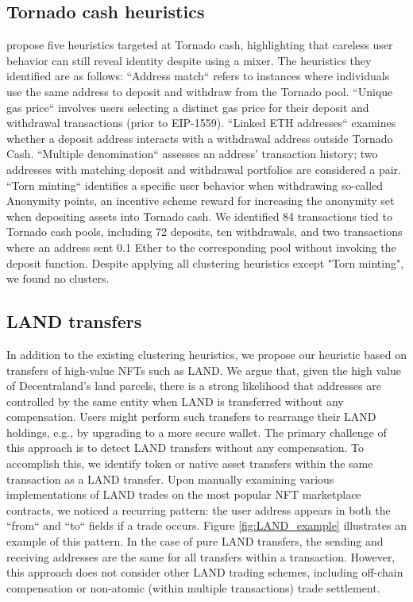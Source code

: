 \documentclass[12pt,a4paper,titlepage,oneside,english]{article}
\begin{document}
\subsection{Tornado cash heuristics}
\cite{wu2022tutela} propose five heuristics targeted at Tornado cash, highlighting that careless user behavior can still reveal identity despite using a mixer. The heuristics they identified are as follows: \newline
``Address match`` refers to instances where individuals use the same address to deposit and withdraw from the Tornado pool. ``Unique gas price`` involves users selecting a distinct gas price for their deposit and withdrawal transactions (prior to EIP-1559). ``Linked ETH addresses`` examines whether a deposit address interacts with a withdrawal address outside Tornado Cash. ``Multiple denomination`` assesses an address' transaction history; two addresses with matching deposit and withdrawal portfolios are considered a pair. ``Torn minting`` identifies a specific user behavior when withdrawing so-called Anonymity points, an incentive scheme reward for increasing the anonymity set when depositing assets into Tornado cash.\newline
We identified 84 transactions tied to Tornado cash pools, including 72 deposits, ten withdrawals, and two transactions where an address sent 0.1 Ether to the corresponding pool without invoking the deposit function.  Despite applying all clustering heuristics except "Torn minting", we found no clusters.

\subsection{LAND transfers}
In addition to the existing clustering heuristics, we propose our heuristic based on transfers of high-value NFTs such as LAND. We argue that, given the high value of Decentraland's land parcels, there is a strong likelihood that addresses are controlled by the same entity when LAND is transferred without any compensation. Users might perform such transfers to rearrange their LAND holdings, e.g., by upgrading to a more secure wallet. \newline
The primary challenge of this approach is to detect LAND transfers without any compensation. To accomplish this, we identify token or native asset transfers within the same transaction as a LAND transfer. Upon manually examining various implementations of LAND trades on the most popular NFT marketplace contracts, we noticed a recurring pattern: the user address appears in both the ``from`` and ``to`` fields if a trade occurs. Figure \ref{fig:LAND_example} illustrates an example of this pattern. 
In the case of pure LAND transfers, the sending and receiving addresses are the same for all transfers within a transaction. However, this approach does not consider other LAND trading schemes, including off-chain compensation or non-atomic (within multiple transactions) trade settlement.
\end{document}
